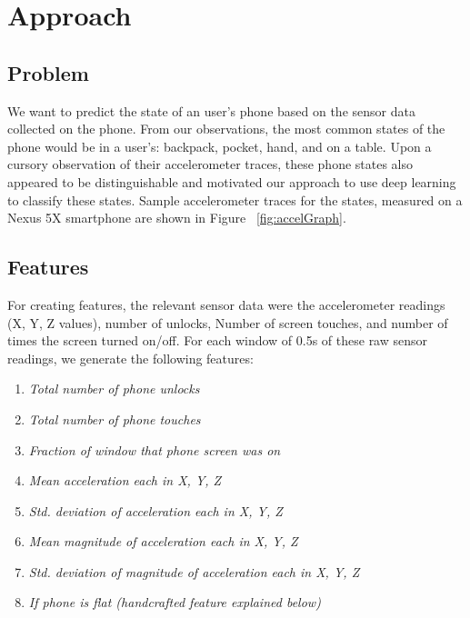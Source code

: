 \section{Approach}

\subsection{Problem}
We want to predict the state of an user's phone based on the sensor data collected on the phone. 
From our observations, the most common states of the phone would be in a user's: backpack, pocket, hand, and on a table.
Upon a cursory observation of their accelerometer traces, these phone states also appeared to be distinguishable and motivated
our approach to use deep learning to classify these states. Sample accelerometer traces for the states, measured on a Nexus 5X
smartphone are shown in Figure ~\ref{fig:accelGraph}.

\begin{center}
 \scalebox{0.375}{}
  \scalebox{0.375}{}
  \scalebox{0.375}{}
  \scalebox{0.375}{}
  \label{fig:accelGraph}
\end{center}



\subsection{Features}
For creating features, the relevant sensor data were the accelerometer readings (X, Y, Z values), number of unlocks, Number of screen touches, and number of times the screen turned on/off. For each window of 0.5s of these raw sensor readings, we generate the following features:

\begin{enumerate}
\item \textit{Total number of phone unlocks}
\item \textit{Total number of phone touches}
\item \textit{Fraction of window that phone screen was on}
\item \textit{Mean acceleration each in X, Y, Z}
\item \textit{Std. deviation of acceleration each in X, Y, Z}
\item \textit{Mean magnitude of acceleration each in X, Y, Z}
\item \textit{Std. deviation of magnitude of acceleration each in X, Y, Z}
\item \textit{If phone is flat (handcrafted feature explained below)}
\end{enumerate}

